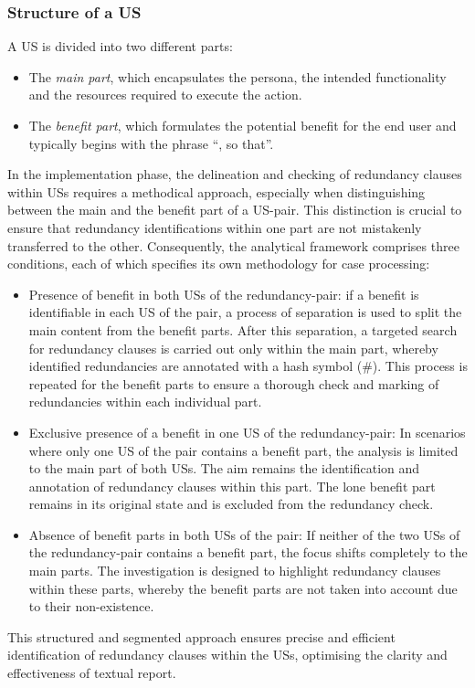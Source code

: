 \subsubsection*{Structure of a US}
A US is divided into two different parts:
\begin{itemize}
	
	\item The \textit{main part}, which encapsulates the persona, the intended functionality and the resources required to execute the action.
	
	\item The \textit{benefit part}, which formulates the potential benefit for the end user and typically begins with the phrase \enquote{, so that}.
	
\end{itemize}
In the implementation phase, the delineation and checking of redundancy clauses within USs requires a methodical approach, especially when distinguishing between the main and the benefit part of a US-pair. This distinction is crucial to ensure that redundancy identifications within one part are not mistakenly transferred to the other. Consequently, the analytical framework comprises three conditions, each of which specifies its own methodology for case processing:
\begin{itemize}
	\item Presence of benefit in both USs of the redundancy-pair: if a benefit is identifiable in each US of the pair, a process of separation is used to split the main content from the benefit parts. After this separation, a targeted search for redundancy clauses is carried out only within the main part, whereby identified redundancies are annotated with a hash symbol (\#). This process is repeated for the benefit parts to ensure a thorough check and marking of redundancies within each individual part.
	
	\item Exclusive presence of a benefit in one US of the redundancy-pair: In scenarios where only one US of the pair contains a benefit part, the analysis is limited to the main part of both USs. The aim remains the identification and annotation of redundancy clauses within this part. The lone benefit part remains in its original state and is excluded from the redundancy check.

	\item Absence of benefit parts in both USs of the pair: If neither of the two USs of the redundancy-pair contains a benefit part, the focus shifts completely to the main parts. The investigation is designed to highlight redundancy clauses within these parts, whereby the benefit parts are not taken into account due to their non-existence.
	
\end{itemize}
This structured and segmented approach ensures precise and efficient identification of redundancy clauses within the USs, optimising the clarity and effectiveness of textual report.

